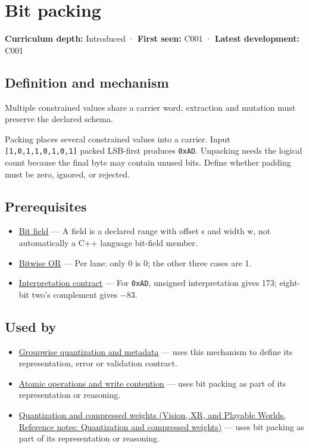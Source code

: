 \hypertarget{appendix-1f9963e1a5d1}{}\label{referencestart:appendix-1f9963e1a5d1}
\section{Bit packing}\label{appendix-1f9963e1a5d1-bit-packing}

\textbf{Curriculum depth:} Introduced · \textbf{First seen:} C001 · \textbf{Latest development:} C001

\subsection{Definition and mechanism}\label{appendix-1f9963e1a5d1-definition-and-mechanism}

Multiple constrained values share a carrier word; extraction and mutation must preserve the declared schema.

Packing places several constrained values into a carrier. Input \texttt{{[}1,0,1,1,0,1,0,1{]}} packed LSB-first produces \texttt{0xAD}. Unpacking needs the logical count because the final byte may contain unused bits. Define whether padding must be zero, ignored, or rejected.

\subsection{Prerequisites}\label{appendix-1f9963e1a5d1-prerequisites}

\begin{itemize}
\tightlist
\item
  \hyperref[appendix-ac697f5c66e8]{Bit field} --- A field is a declared range with offset s and width w, not automatically a C++ language bit-field member.
\item
  \hyperref[appendix-a427ce8ce8a6]{Bitwise OR} --- Per lane: only 0 is 0; the other three cases are 1.
\item
  \hyperref[appendix-f414bd4ed05c]{Interpretation contract} --- For \texttt{0xAD}, unsigned interpretation gives 173; eight-bit two's complement gives −83.
\end{itemize}

\subsection{Used by}\label{appendix-1f9963e1a5d1-used-by}

\begin{itemize}
\item
  \hyperref[appendix-638204c40e8b]{Groupwise quantization and metadata} --- uses this mechanism to define its representation, error or validation contract.
\item
  \hyperref[appendix-e12d1b03fefb]{Atomic operations and write contention} --- uses bit packing as part of its representation or reasoning.
\item
  \href{../07-Vision-XR-and-Playable-Worlds/main.pdf\#nameddest=appendix-fdc7879e8bf2}{Quantization and compressed weights (Vision, XR, and Playable Worlds, Reference notes: Quantization and compressed weights)} --- uses bit packing as part of its representation or reasoning.
\end{itemize}

